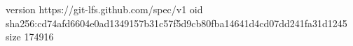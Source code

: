 version https://git-lfs.github.com/spec/v1
oid sha256:cd74afd6604e0ad1349157b31c57f5d9cb80fba14641d4cd07dd241fa31d1245
size 174916
